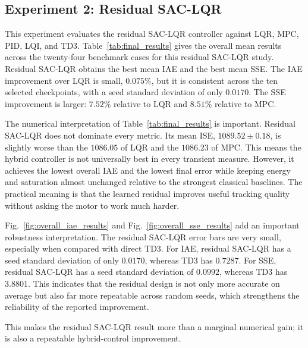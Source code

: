 \documentclass[conference]{IEEEtran}
\begin{document}
\subsection{Experiment 2: Residual SAC-LQR}
This experiment evaluates the residual SAC-LQR controller against LQR, MPC, PID, LQI, and TD3. Table~\ref{tab:final_results} gives the overall mean results across the twenty-four benchmark cases for this residual SAC-LQR study. Residual SAC-LQR obtains the best mean IAE and the best mean SSE. The IAE improvement over LQR is small, $0.075\%$, but it is consistent across the ten selected checkpoints, with a seed standard deviation of only $0.0170$. The SSE improvement is larger: $7.52\%$ relative to LQR and $8.51\%$ relative to MPC.

The numerical interpretation of Table~\ref{tab:final_results} is important. Residual SAC-LQR does not dominate every metric. Its mean ISE, $1089.52 \pm 0.18$, is slightly worse than the $1086.05$ of LQR and the $1086.23$ of MPC. This means the hybrid controller is not universally best in every transient measure. However, it achieves the lowest overall IAE and the lowest final error while keeping energy and saturation almost unchanged relative to the strongest classical baselines. The practical meaning is that the learned residual improves useful tracking quality without asking the motor to work much harder.

Fig.~\ref{fig:overall_iae_results} and Fig.~\ref{fig:overall_sse_results} add an important robustness interpretation. The residual SAC-LQR error bars are very small, especially when compared with direct TD3. For IAE, residual SAC-LQR has a seed standard deviation of only $0.0170$, whereas TD3 has $0.7287$. For SSE, residual SAC-LQR has a seed standard deviation of $0.0992$, whereas TD3 has $3.8801$. This indicates that the residual design is not only more accurate on average but also far more repeatable across random seeds, which strengthens the reliability of the reported improvement.

This makes the residual SAC-LQR result more than a marginal numerical gain; it is also a repeatable hybrid-control improvement.
\end{document}
